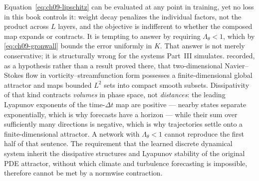 Equation~\eqref{eq:ch09-lipschitz} can be evaluated at any point in training, yet
no loss in this book controls it: weight decay penalizes the individual factors,
not the product across $L$ layers, and the objective is indifferent to
whether the composed map expands or contracts. It is tempting to answer by
requiring $\Lambda_\theta<1$, which by \eqref{eq:ch09-gronwall} bounds the error
uniformly in $K$. That answer is not merely conservative; it is
structurally wrong for the systems Part~III simulates.
 recorded, as a
hypothesis rather than a result proved there, that
two-dimensional Navier--Stokes flow in vorticity--streamfunction form possesses a
finite-dimensional global attractor and maps bounded $L^2$ sets into compact
smooth subsets. Dissipativity of that kind contracts \emph{volumes} in phase
space, not \emph{distances}: the leading Lyapunov
exponents of the time-$\Delta t$ map are positive --- nearby states separate
exponentially, which is why forecasts have a horizon --- while their sum over
sufficiently many directions is negative, which is why trajectories settle onto
a finite-dimensional attractor. A network with $\Lambda_\theta<1$ cannot
reproduce the first half of that sentence. The requirement that the learned
discrete dynamical system inherit the dissipative structures and Lyapunov
stability of the original PDE attractor, without which climate and turbulence
forecasting is impossible, therefore cannot be met by a normwise contraction.


